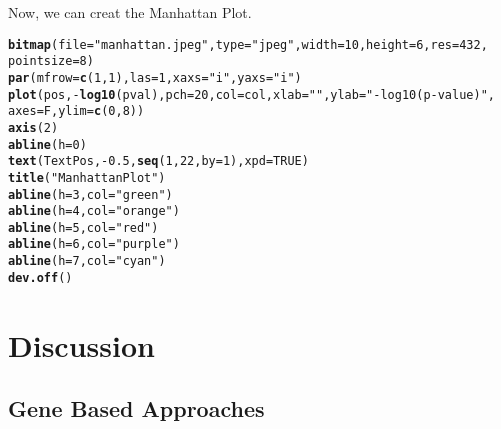 \documentclass[11pt]{article}\usepackage[]{graphicx}\usepackage[]{color}
\makeatletter
\newcommand{\hlnum}[1]{\textcolor[rgb]{0.686,0.059,0.569}{#1}}%
\newcommand{\hlstr}[1]{\textcolor[rgb]{0.192,0.494,0.8}{#1}}%
\newcommand{\hlopt}[1]{\textcolor[rgb]{0,0,0}{#1}}%
\newcommand{\hlstd}[1]{\textcolor[rgb]{0.345,0.345,0.345}{#1}}%
\newcommand{\hlkwc}[1]{\textcolor[rgb]{0.333,0.667,0.333}{#1}}%
\newcommand{\hlkwd}[1]{\textcolor[rgb]{0.737,0.353,0.396}{\textbf{#1}}}%
\newenvironment{kframe}{%
 \def\at@end@of@kframe{}%
 \ifinner\ifhmode%
  \def\at@end@of@kframe{\end{minipage}}%
  \begin{minipage}{\columnwidth}%
 \fi\fi%
 \def\FrameCommand##1{\hskip\@totalleftmargin \hskip-\fboxsep
 \colorbox{shadecolor}{##1}\hskip-\fboxsep
     \hskip-\linewidth \hskip-\@totalleftmargin \hskip\columnwidth}%
 \MakeFramed {\advance\hsize-\width
   \@totalleftmargin\z@ \linewidth\hsize
   \@setminipage}}%
 {\par\unskip\endMakeFramed%
 \at@end@of@kframe}
\newenvironment{knitrout}{}{} %
\makeatother
\begin{document}
Now, we can creat the Manhattan Plot.

\begin{knitrout}
\color{fgcolor}\begin{kframe}
\begin{alltt}
\hlkwd{bitmap}\hlstd{(}\hlkwc{file} \hlstd{=} \hlstr{"manhattan.jpeg"}\hlstd{,} \hlkwc{type} \hlstd{=} \hlstr{"jpeg"}\hlstd{,} \hlkwc{width} \hlstd{=} \hlnum{10}\hlstd{,} \hlkwc{height} \hlstd{=} \hlnum{6}\hlstd{,} \hlkwc{res} \hlstd{=} \hlnum{432}\hlstd{,}
    \hlkwc{pointsize} \hlstd{=} \hlnum{8}\hlstd{)}
\hlkwd{par}\hlstd{(}\hlkwc{mfrow} \hlstd{=} \hlkwd{c}\hlstd{(}\hlnum{1}\hlstd{,} \hlnum{1}\hlstd{),} \hlkwc{las} \hlstd{=} \hlnum{1}\hlstd{,} \hlkwc{xaxs} \hlstd{=} \hlstr{"i"}\hlstd{,} \hlkwc{yaxs} \hlstd{=} \hlstr{"i"}\hlstd{)}
\hlkwd{plot}\hlstd{(pos,} \hlopt{-}\hlkwd{log10}\hlstd{(pval),} \hlkwc{pch} \hlstd{=} \hlnum{20}\hlstd{,} \hlkwc{col} \hlstd{= col,} \hlkwc{xlab} \hlstd{=} \hlstr{""}\hlstd{,} \hlkwc{ylab} \hlstd{=} \hlstr{"-log10(p-value)"}\hlstd{,}
    \hlkwc{axes} \hlstd{= F,} \hlkwc{ylim} \hlstd{=} \hlkwd{c}\hlstd{(}\hlnum{0}\hlstd{,} \hlnum{8}\hlstd{))}
\hlkwd{axis}\hlstd{(}\hlnum{2}\hlstd{)}
\hlkwd{abline}\hlstd{(}\hlkwc{h} \hlstd{=} \hlnum{0}\hlstd{)}
\hlkwd{text}\hlstd{(TextPos,} \hlopt{-}\hlnum{0.5}\hlstd{,} \hlkwd{seq}\hlstd{(}\hlnum{1}\hlstd{,} \hlnum{22}\hlstd{,} \hlkwc{by} \hlstd{=} \hlnum{1}\hlstd{),} \hlkwc{xpd} \hlstd{=} \hlnum{TRUE}\hlstd{)}
\hlkwd{title}\hlstd{(}\hlstr{"Manhattan Plot"}\hlstd{)}
\hlkwd{abline}\hlstd{(}\hlkwc{h} \hlstd{=} \hlnum{3}\hlstd{,} \hlkwc{col} \hlstd{=} \hlstr{"green"}\hlstd{)}
\hlkwd{abline}\hlstd{(}\hlkwc{h} \hlstd{=} \hlnum{4}\hlstd{,} \hlkwc{col} \hlstd{=} \hlstr{"orange"}\hlstd{)}
\hlkwd{abline}\hlstd{(}\hlkwc{h} \hlstd{=} \hlnum{5}\hlstd{,} \hlkwc{col} \hlstd{=} \hlstr{"red"}\hlstd{)}
\hlkwd{abline}\hlstd{(}\hlkwc{h} \hlstd{=} \hlnum{6}\hlstd{,} \hlkwc{col} \hlstd{=} \hlstr{"purple"}\hlstd{)}
\hlkwd{abline}\hlstd{(}\hlkwc{h} \hlstd{=} \hlnum{7}\hlstd{,} \hlkwc{col} \hlstd{=} \hlstr{"cyan"}\hlstd{)}
\hlkwd{dev.off}\hlstd{()}
\end{alltt}
\end{kframe}
\end{knitrout}


\section{Discussion}

\subsection{Gene Based Approaches}
\end{document}

